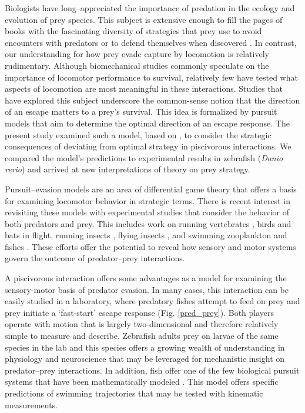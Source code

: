 \documentclass[12pt]{article}
\begin{document}
Biologists have long--appreciated the importance of predation in the ecology and evolution of prey species. This subject is extensive enough to fill the pages of books with the fascinating diversity of strategies that prey use to avoid encounters with predators \citep[e.g.][]{Ruxton:2004vb} or to defend themselves when discovered \citep[e.g.][]{Emlen:2014wb, Evans:1990va}. 
In contrast, our understanding for how prey evade capture by locomotion is relatively rudimentary. Although biomechanical studies commonly speculate on the importance of locomotor performance to survival, relatively few have tested what aspects of locomotion are most meaningful in these interactions. 
Studies that have explored this subject \citep[reviewed by][]{Domenici:2011tv} underscore the common-sense notion that the direction of an escape matters to a prey's survival. This idea is formalized by pursuit models that aim to determine the optimal direction of an escape response. 
The present study examined such a model, based on \cite{Weihs:1984tb}, to consider the strategic consequences of deviating from optimal strategy in piscivorous interactions. We compared the model's predictions to experimental results in zebrafish (\textit{Danio rerio}) \citep{Stewart:2014cm} and arrived at new interpretations of theory on prey strategy.

Pursuit--evasion models are an area of differential game theory that offers a basis for examining locomotor behavior in strategic terms. There is recent interest in revisiting these models \citep[e.g.][]{Howland:1974, Weihs:1984tb} with experimental studies that consider the behavior of both predators and prey. 
This includes work on running vertebrates \citep[e.g.][]{Wilson:2014fd}, birds \citep[e.g.][]{Kullberg:1998ur} and bats \citep[e.g.][]{Ghose:2006dk} in flight, running insects \citep{Domenici:2008kra}, flying insects \citep[e.g.][]{Combes:2012eta}, and swimming zooplankton \citep[e.g.][]{Arnott:1999wx, Heuch:2007kk} and fishes \citep[e.g.][]{Domenici:2000un}. 
These efforts offer the potential to reveal how sensory and motor systems govern the outcome of predator--prey interactions. 

A piscivorous interaction offers some advantages as a model for examining the sensory-motor basis of predator evasion. In many cases, this interaction can be easily studied in a laboratory, where predatory fishes attempt to feed on prey and prey initiate a `fast-start' escape response (Fig. \ref{pred_prey}). 
Both players operate with motion that is largely two-dimensional and therefore relatively simple to measure and describe. 
Zebrafish adults prey on larvae of the same species in the lab \citep{Stewart:2013bh} and this species offers a growing wealth of understanding in physiology and neuroscience \citep[e.g.][]{McLean:2011gi, Briggs:2002uf} that may be leveraged for mechanistic insight on predator--prey interactions. 
In addition, fish offer one of the few biological pursuit systems that have been mathematically modeled \citep{Weihs:1984tb}. This model offers specific predictions of swimming trajectories that may be tested with kinematic measurements. 
\end{document}
